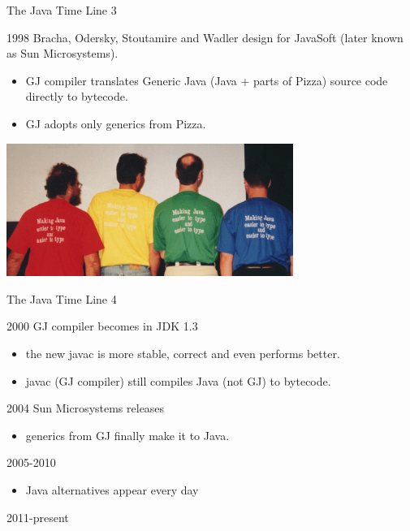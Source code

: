 \begin{frame}{The Java Time Line 3}
\begin{block}{1998}
Bracha, Odersky, Stoutamire and Wadler design  for
JavaSoft (later known as Sun Microsystems).
\begin{itemize}
\item GJ compiler translates Generic Java (Java + parts of Pizza) source code
directly to bytecode.
\item GJ adopts only generics from Pizza.
\end{itemize}
\end{block}
\begin{center}
\includegraphics[width=0.7\textwidth]{resources/GJBack.jpg}
\end{center}
\end{frame}

\begin{frame}{The Java Time Line 4}
\begin{block}{2000}
GJ compiler becomes  in JDK 1.3
\begin{itemize}
\item the new javac is more stable, correct and even performs better.
\item javac (GJ compiler) still compiles Java (\alert{not} GJ) to bytecode.
\end{itemize}
\end{block}
\pause
\begin{block}{2004}
Sun Microsystems releases 
\begin{itemize}
\item generics from GJ finally make it to Java.
\end{itemize}
\end{block}
\pause
\begin{block}{2005-2010}
\begin{itemize}
\item Java alternatives appear every day
\end{itemize}
\end{block}
\pause
\begin{block}{2011-present}
\end{block}
\end{frame}

